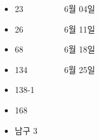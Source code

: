 \documentclass[	14pt, 
							a0paper, 
							landscape, 	%
							margin=0mm, %
							innermargin=4mm,  		%
							blockverticalspace=4mm, %
							colspace=5mm, 
							subcolspace=0mm
							]{tikzposter}
\begin{document}
\begin{columns}
		{
			\setlength{\leftmargini}{5em}			
			\setlength{\labelsep}{1em} %
			\begin{LARGE}
			\begin{itemize}
			\item 	23
			\item 	26
			\item 	68
			\item 	134
			\item 	138-1
			\item 	168
			\item 	남구 3
			\end{itemize}
			\end{LARGE}
		}		



			{				
			\setlength{\leftmargini}{9em}			
			\setlength{\labelsep}{1em} %

			\begin{LARGE}
			\begin{itemize}
			\item [6월 04일]
			\item [6월 11일]
			\item [6월 18일]
			\item [6월 25일]



			\end{itemize}
			\end{LARGE}
		}



	\end{columns}
\end{document}
